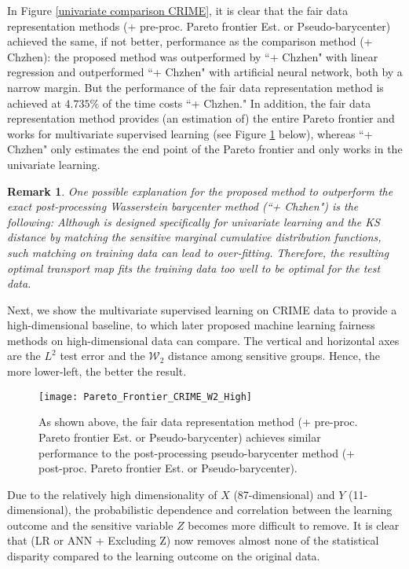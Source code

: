 \documentclass[twoside,11pt]{article}
\newtheorem{rema}{Remark}[section]{\bfseries}{\itshape}
\begin{document}
In Figure \ref{univariate comparison CRIME}, it is clear that the fair data representation methods (+ pre-proc. Pareto frontier Est. or Pseudo-barycenter) achieved the same, if not better, performance as the comparison method (+ Chzhen): the proposed method was outperformed by ``+ Chzhen" with linear regression and outperformed ``+ Chzhen" with artificial neural network, both by a narrow margin. But the performance of the fair data representation method is achieved at $4.735 \%$ of the time costs ``+ Chzhen." In addition, the fair data representation method provides (an estimation of) the entire Pareto frontier and works for multivariate supervised learning (see Figure \ref{multivariate comparison} below), whereas ``+ Chzhen" only estimates the end point of the Pareto frontier and only works in the univariate learning.

\begin{rema}
One possible explanation for the proposed method to outperform the exact post-processing Wasserstein barycenter method (``+ Chzhen") is the following: Although \cite{chzhen2020fair} is designed specifically for univariate learning and the KS distance by matching the sensitive marginal cumulative distribution functions, such matching on training data can lead to over-fitting. Therefore, the resulting optimal transport map fits the training data too well to be optimal for the test data.
\end{rema}

Next, we show the multivariate supervised learning on CRIME data to provide a high-dimensional baseline, to which later proposed machine learning fairness methods on high-dimensional data can compare. The vertical and horizontal axes are the $L^2$ test error and the $\mathcal{W}_2$ distance among sensitive groups. Hence, the more lower-left, the better the result.

\begin{figure}[H]
\centering
\texttt{[image: Pareto\_Frontier\_CRIME\_W2\_High]}
\caption{As shown above, the fair data representation method (+ pre-proc. Pareto frontier Est. or Pseudo-barycenter) achieves similar performance to the post-processing pseudo-barycenter method (+ post-proc. Pareto frontier Est. or Pseudo-barycenter).}
\label{multivariate comparison}
\end{figure}

Due to the relatively high dimensionality of $X$ (87-dimensional) and $Y$ (11-dimensional), the probabilistic dependence and correlation between the learning outcome and the sensitive variable $Z$ becomes more difficult to remove. It is clear that (LR or ANN + Excluding Z) now removes almost none of the statistical disparity compared to the learning outcome on the original data.
\end{document}
